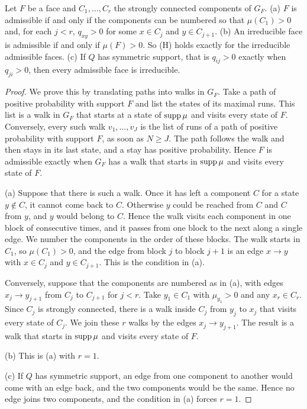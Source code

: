 \begin{lemma}\label{lem:admissible}
Let $F$ be a face and $C_1,\dots,C_r$ the strongly connected components of
$G_F$. \textup{(a)} $F$ is admissible if and only if the components can be
numbered so that $\mu(C_1)>0$ and, for each $j<r$, $q_{xy}>0$ for some $x\in
C_j$ and $y\in C_{j+1}$. \textup{(b)} An irreducible face is admissible if and
only if $\mu(F)>0$. So \textup{(H)} holds exactly for the irreducible admissible
faces. \textup{(c)} If $Q$ has symmetric support, that is $q_{ij}>0$ exactly
when $q_{ji}>0$, then every admissible face is irreducible.
\end{lemma}

\begin{proof}
We prove this by translating paths into walks in $G_F$. Take a path of positive probability
with support $F$ and list the states of its maximal runs. This list is a walk
in $G_F$ that starts at a state of $\operatorname{supp}\mu$ and visits every state of $F$.
Conversely, every such walk $v_1,\dots,v_J$ is the list of runs of a path of
positive probability with support $F$, as soon as $N\ge J$. The path follows
the walk and then stays in its last state, and a stay has positive probability.
Hence $F$ is admissible exactly when $G_F$ has a walk
that starts in $\operatorname{supp}\mu$ and visits every state of $F$.

(a) Suppose that there is such a walk. Once it has left a component $C$ for a
state $y\notin C$, it cannot come back to $C$. Otherwise $y$ could be reached
from $C$ and $C$ from $y$, and $y$ would belong to $C$. Hence the walk visits
each component in one block of consecutive times, and it passes from one block
to the next along a single edge. We number the components in the order of these
blocks. The walk starts in $C_1$, so $\mu(C_1)>0$, and the edge from block $j$
to block $j+1$ is an edge $x\to y$ with $x\in C_j$ and $y\in C_{j+1}$. This is
the condition in (a).

Conversely, suppose that the components are numbered as in (a), with edges
$x_j\to y_{j+1}$ from $C_j$ to $C_{j+1}$ for $j<r$. Take $y_1\in C_1$ with
$\mu_{y_1}>0$ and any $x_r\in C_r$. Since $C_j$ is strongly connected, there is
a walk inside $C_j$ from $y_j$ to $x_j$ that visits every state of $C_j$. We
join these $r$ walks by the edges $x_j\to y_{j+1}$. The result is a walk that
starts in $\operatorname{supp}\mu$ and visits every state of $F$.

(b) This is (a) with $r=1$.

(c) If $Q$ has symmetric support, an edge from one component to another would
come with an edge back, and the two components would be the same. Hence no edge
joins two components, and the condition in (a) forces $r=1$.
\end{proof}

